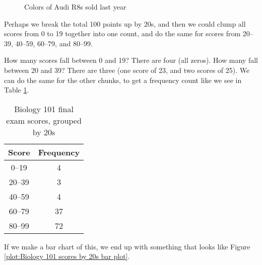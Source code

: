 \documentclass[../../../main.tex]{subfiles}
\begin{document}
\begin{figure}[ht]
  \caption{\label{plot:Biology 101 scores bar plot} Colors of Audi R8s sold last year}
\end{figure}

Perhaps we break the total 100 points up by 20s, and then we could clump all scores from 0 to 19 together into one count, and do the same for scores from 20--39, 40--59, 60--79, and 80--99.

How many scores fall between 0 and 19? There are four (all zeros). How many fall between 20 and 39? There are three (one score of 23, and two scores of 25). We can do the same for the other chunks, to get a frequency count like we see in Table \ref{table:Biology 101 scores by 20s}.

\begin{table}[ht]
  \begin{tabular}{| c | c |}
    \hline
    \textbf{Score} & \textbf{Frequency} \\ \hline
    0--19 & 4 \\ \hline
    20--39 & 3 \\ \hline
    40--59 & 4 \\ \hline
    60--79 & 37 \\ \hline
    80--99 & 72 \\ \hline
  \end{tabular}
  \caption{\label{table:Biology 101 scores by 20s}Biology 101 final exam scores, grouped by 20s}  
\end{table}

If we make a bar chart of this, we end up with something that looks like Figure \ref{plot:Biology 101 scores by 20s bar plot}.
\end{document}
